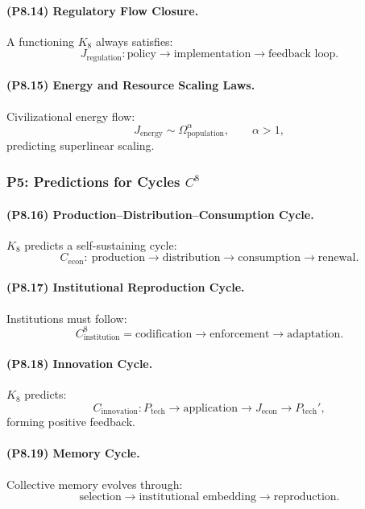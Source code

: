 \paragraph{(P8.14) Regulatory Flow Closure.}
A functioning $K_8$ always satisfies:
\[
J_{\mathrm{regulation}}: \text{policy} 
\to \text{implementation} 
\to \text{feedback loop}.
\]

\paragraph{(P8.15) Energy and Resource Scaling Laws.}
Civilizational energy flow:
\[
J_{\mathrm{energy}} \sim \Omega_{\mathrm{population}}^\alpha,
\qquad 
\alpha > 1,
\]
predicting superlinear scaling.

\subsubsection{P5: Predictions for Cycles $C^{8}$}

\paragraph{(P8.16) Production–Distribution–Consumption Cycle.}
$K_8$ predicts a self-sustaining cycle:
\[
C_{\mathrm{econ}}
: \ 
\text{production} 
\to \text{distribution} 
\to \text{consumption} 
\to \text{renewal}.
\]

\paragraph{(P8.17) Institutional Reproduction Cycle.}
Institutions must follow:
\[
C_{\mathrm{institution}}^8 
=
\text{codification} 
\to \text{enforcement} 
\to \text{adaptation}.
\]

\paragraph{(P8.18) Innovation Cycle.}
$K_8$ predicts:
\[
C_{\mathrm{innovation}} 
: P_{\mathrm{tech}} 
\to \text{application} 
\to J_{\mathrm{econ}} 
\to P_{\mathrm{tech}}',
\]
forming positive feedback.

\paragraph{(P8.19) Memory Cycle.}
Collective memory evolves through:
\[
\text{selection} 
\to \text{institutional embedding} 
\to \text{reproduction}.
\]

